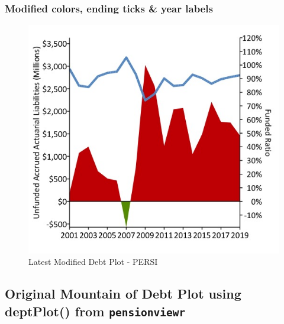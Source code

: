 \documentclass[
]{article}
\begin{document}
\hypertarget{modified-colors-ending-ticks-year-labels}{%
\subsubsection{Modified colors, ending ticks \& year
labels}\label{modified-colors-ending-ticks-year-labels}}

\begin{figure}
\centering
\includegraphics{PERSI.debptPlot2.jpeg}
\caption{Latest Modified Debt Plot - PERSI}
\end{figure}

\hypertarget{original-mountain-of-debt-plot-using-deptplot-from-pensionviewr}{%
\subsection{\texorpdfstring{Original Mountain of Debt Plot using
deptPlot() from
\texttt{pensionviewr}}{Original Mountain of Debt Plot using deptPlot() from pensionviewr}}\label{original-mountain-of-debt-plot-using-deptplot-from-pensionviewr}}
\end{document}
